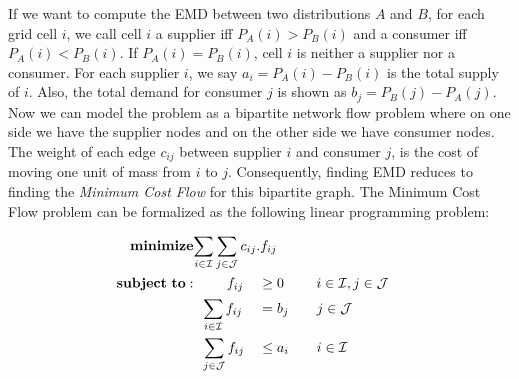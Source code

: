 If we want to compute the EMD between two distributions $A$ and $B$, for each grid cell $i$, we call cell $i$ a supplier iff $P_A(i) > P_B(i)$ and a consumer iff $P_A(i) < P_B(i)$. If $P_A(i) = P_B(i)$, cell $i$ is neither a supplier nor a consumer. For each supplier $i$, we say $a_i = P_A(i) - P_B(i)$ is the total supply of $i$. Also, the total demand for consumer $j$ is shown as $b_j = P_B(j) - P_A(j)$. Now we can model the problem as a bipartite network flow problem where on one side we have the supplier nodes and on the other side we have consumer nodes. The weight of each edge $c_{ij}$ between supplier $i$ and consumer $j$, is the cost of moving one unit of mass from $i$ to $j$.  Consequently, finding EMD reduces to finding the \textit{Minimum Cost Flow} for this bipartite graph. The Minimum Cost Flow problem can be formalized as the following linear programming problem:


\setcounter{equation}{0}
\begin{alignat}{2}
\mathbf{minimize}&\mathrlap{\sum_{i \in \mathcal{I}} \sum_{j \in \mathcal{J}} c_{ij}.f_{ij}} \notag\\
\mathbf{subject\ to:}&\phantom{{a}={a}} f_{ij} && \geq 0 \ \quad\quad i \in \mathcal{I}, j \in \mathcal{J}\\
&\phantom{{a}}\sum_{i \in \mathcal{I}} f_{ij} &&= b_j \quad\quad j \in \mathcal{J}\\
&\phantom{{a}}\sum_{j \in \mathcal{J}} f_{ij} &&\leq a_i \quad\quad i \in \mathcal{I}
\end{alignat}



